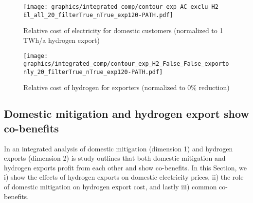 \begin{figure*}[h!]
    \centering
    \begin{subfigure}[b]{0.49\linewidth}
        \centering
        \texttt{[image: graphics/integrated\_comp/contour\_exp\_AC\_exclu\_H2 El\_all\_20\_filterTrue\_nTrue\_exp120-PATH.pdf]}
        \caption{Relative cost of electricity for domestic customers (normalized to 1 TWh/a hydrogen export)}
        \label{fig:expense_ac_120}
    \end{subfigure}
    \hfill
    \begin{subfigure}[b]{0.49\linewidth}
        \centering
        \texttt{[image: graphics/integrated\_comp/contour\_exp\_H2\_False\_False\_exportonly\_20\_filterTrue\_nTrue\_exp120-PATH.pdf]}
        \caption{Relative cost of hydrogen for exporters (normalized to 0\% \co reduction)}
        \label{fig:expense_h2_120}
    \end{subfigure}
    \hfill
    \caption{  
    Cost for domestic electricity consumers (\ref{fig:expense_ac_120}) and hydrogen exporters (\ref{fig:expense_h2_120}),
    normalized to costs at 1 TWh/a hydrogen export (\ref{fig:expense_ac_120}) and
    to 0\% \co reduction (\ref{fig:expense_h2_120})
    at each mitigation level. Domestic electricity consumers profit from increasing hydrogen exports, especially at low domestic mitigation and high exports. Hydrogen exporters profit from domestic mitigation at medium mitigation efforts. Both (\ref{fig:expense_ac_120}) and (\ref{fig:expense_h2_120}) include possible pathways of i) quick exports and slow mitigation, ii) balanced exports and mitigation and iii) slow exports and quick mitigation. Years are illustrative.}
    \label{fig:expenses_default_120}
\end{figure*}


\subsection*{Domestic mitigation and hydrogen export show co-benefits}
\label{subsec:benefits}


In an integrated analysis of domestic mitigation (dimension 1) and hydrogen exports (dimension 2) is study outlines that both domestic mitigation and hydrogen exports profit from each other and show co-benefits. In this Section, we i) show the effects of hydrogen exports on domestic electricity prices, ii) the role of domestic mitigation on hydrogen export cost, and lastly iii) common co-benefits.

